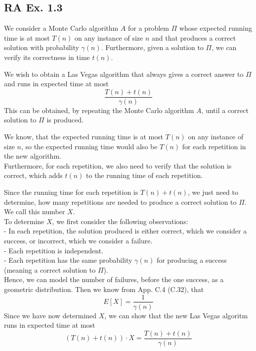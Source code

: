 \subsection*{RA Ex. 1.3}
We consider a Monte Carlo algorithm $A$ for a problem $\Pi$ whose expected running time is at most $T(n)$ on any instance of size $n$ and that produces a correct solution with probability $\gamma(n)$. Furthermore, given a solution to $\Pi$, we can verify its correctness in time $t(n)$.

We wish to obtain a Las Vegas algorithm that always gives a correct answer to $\Pi$ and runs in expected time at most
$$
\frac{T(n) + t(n)}{\gamma(n)}
$$
This can be obtained, by repeating the Monte Carlo algorithm $A$, until a correct solution to $\Pi$ is produced.

We know, that the expected running time is at most $T(n)$ on any instance of size $n$, so the expected running time would also be $T(n)$ for each repetition in the new algorithm.
\\
Furthermore, for each repetition, we also need to verify that the solution is correct, which adds $t(n)$ to the running time of each repetition.

Since the running time for each repetition is $T(n) + t(n)$, we just need to determine, how many repetitions are needed to produce a correct solution to $\Pi$. We call this number $X$.
\\
To determine $X$, we first consider the following observations:
\\
- In each repetition, the solution produced is either correct, which we consider a success, or incorrect, which we consider a failure.
\\
- Each repetition is independent.
\\
- Each repetition has the same probability $\gamma(n)$ for producing a success (meaning a correct solution to $\Pi$).
\\
Hence, we can model the number of failures, before the one success, as a geometric distribution. Then we know from App. C.4 (C.32), that
$$
E\left[X\right] = \frac{1}{\gamma(n)}
$$
Since we have now determined $X$, we can show that the new Las Vegas algoritm runs in expected time at most
$$
\left(T(n) + t(n)\right) \cdot X = \frac{T(n) + t(n)}{\gamma(n)}
$$